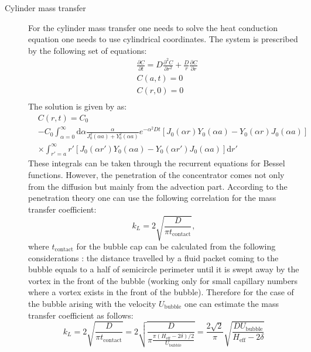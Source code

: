 \documentclass{article}
\begin{document}
\begin{description}
\item[Cylinder mass transfer] For the cylinder mass transfer one needs to solve the heat conduction
equation one needs to use cylindrical coordinates. The system is prescribed by the following set
of equations:
\begin{equation}
\begin{aligned}
&\frac{\partial C}{\partial t}=D\frac{\partial^2 C}{\partial r^2} + \frac{D}{r}\frac{\partial
C}{\partial r}\\
&C(a,t)=0\\
&C(r,0)=0\\
\end{aligned}
\end{equation}
The solution is given by \citet{ozisik} as:
\begin{equation}
\begin{aligned}
&C(r,t)=C_0\\
& - C_0\int_{\alpha=0}^{\infty}{\mathrm{d}\alpha \frac{\alpha}{J_0^2(\alpha
a)+Y_0^2(\alpha a)}e^{-\alpha^2 D t}[J_0(\alpha r) Y_0(\alpha a)-Y_0(\alpha r) J_0(\alpha a)]}\\
&\times \int_{r'=a}^{\infty}{r'[J_0(\alpha r')Y_0(\alpha a)-Y_0(\alpha r') J_0(\alpha
a)]\mathrm{d}r'}
\end{aligned}
\end{equation}
These integrals can be taken through the recurrent equations for Bessel functions. However, the
penetration of the concentrator comes not only from the diffusion but mainly from the advection
part. According to the penetration theory one can use the following correlation for the mass
transfer coefficient:
\begin{equation}
k_L=2\sqrt{\frac{D}{\pi t_{\mathrm{contact}}}},
\end{equation}
where $t_{\mathrm{contact}}$ for the bubble cap can be calculated from the following considerations
\cite{vanbaten-circular}: the distance travelled by a fluid packet coming to the bubble equals to a
half of semicircle perimeter until it is swept away by the vortex in the front of the bubble
{\color{red} (working only for small capillary numbers where a vortex exists in the front of the
bubble)}. Therefore for the case of the bubble arising with the velocity $U_{\mathrm{bubble}}$ one
can estimate the mass transfer coefficient as follows:
\begin{equation}
k_L=2\sqrt{\frac{D}{\pi t_{\mathrm{contact}}}}=2\sqrt{\frac{D}{\pi \frac{ \pi
(H_{\mathrm{eff}}-2\delta)/2}{U_{\mathrm{bubble}}}}}=\frac{2\sqrt{2}}{\pi}\sqrt{\frac{D
U_{\mathrm{bubble}}}{H_{\mathrm{eff}}-2\delta}}

\end{equation}
\end{description}
\end{document}
